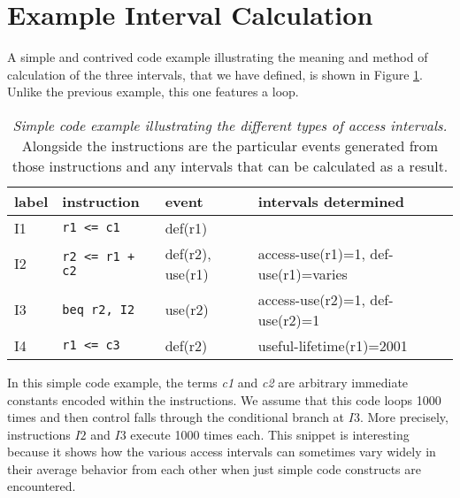 \documentclass[10pt,dvips]{article}
\begin{document}
\section{Example Interval Calculation}
%
A simple and contrived 
code example illustrating the meaning and method of calculation
of the three
intervals, that we have defined, is shown in Figure \ref{tab:code2}.
Unlike the previous example, this one features a loop.
%
\begin{table}
\begin{center}
\caption{{\em Simple code example illustrating the different types of
access intervals.}
Alongside the instructions are the particular events generated
from those instructions and any intervals that can be calculated
as a result.}
\label{tab:code2}
\vspace{+0.1in}
\begin{tabular}{l|l|l|l}
\hline 
label&instruction&event&intervals determined\\
\hline 
\hline 
I1&\verb"r1 <= c1"&def(r1)& \\
\hline
I2&\verb"r2 <= r1 + c2"&def(r2), use(r1)&
access-use(r1)=1, def-use(r1)=varies \\
\hline
I3&\verb"beq r2, I2"&use(r2)&
access-use(r2)=1, def-use(r2)=1 \\
\hline
I4&\verb"r1 <= c3"&def(r2)&
useful-lifetime(r1)=2001\\
\hline
\end{tabular}
\end{center}
\end{table}
%
In this simple code example, the terms \textit{c1} and \textit{c2} are
arbitrary
immediate constants encoded within the instructions.
We assume that this code loops 1000 times and then control falls
through the conditional branch at $ I3 $.  More precisely,
instructions $ I2 $ and $ I3 $ execute 1000 times each.
This snippet is interesting because it shows how the various
access intervals can sometimes vary widely in their average
behavior from each other when just simple code constructs are 
encountered.
\end{document}
